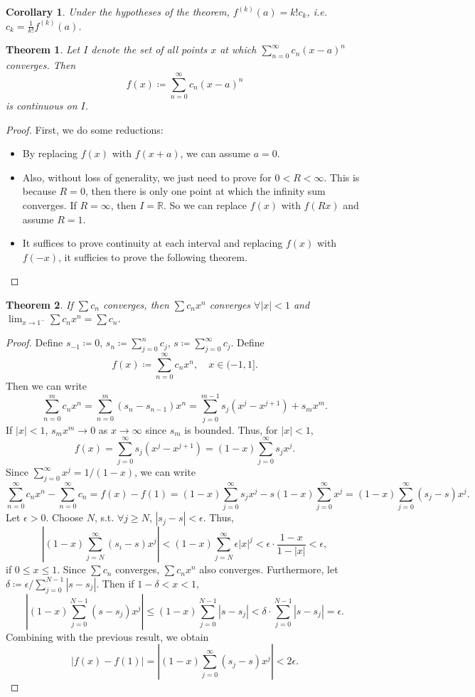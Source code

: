 \documentclass[12pt]{article}
\theoremstyle{plain}
\newtheorem{thm}{Theorem}
\newtheorem*{corollary}{Corollary}
\theoremstyle{definition}
\begin{document}
\begin{corollary}
    Under the hypotheses of the theorem, $f^{(k)}(a)=k!c_k$, i.e. $c_k=\frac{1}{k!}f^{(k)}(a)$.
\end{corollary}


\begin{thm}
    Let $I$ denote the set of all points $x$ at which $\sum_{n=0}^\infty c_n(x-a)^n$ converges.
    Then
    $$f(x)\coloneqq \sum_{n=0}^\infty c_n(x-a)^n$$
    is continuous on $I$.
\end{thm}
\begin{proof}
    First, we do some reductions:
    \begin{itemize}
        \item By replacing $f(x)$ with $f(x+a)$, we can assume $a=0$.
        \item Also, without loss of generality, we just need to prove for $0<R<\infty$.
        This is because $R=0$, then there is only one point at which the infinity sum converges.
        If $R=\infty$, then $I=\mathbb{R}$.
        So we can  replace $f(x)$ with $f(Rx)$ and assume $R=1$.
        \item It suffices to prove continuity at each interval and replacing $f(x)$ with $f(-x)$, it
        sufficies to prove the following theorem.
    \end{itemize}
\end{proof}

\begin{thm}
    If $\sum c_n$ converges, then $\sum c_n x^n$ converges $\forall |x|<1$ and $\lim_{x\rightarrow
    1^-}\sum c_n x^n = \sum c_n$.
\end{thm}
\begin{proof}
    Define $s_{-1}\coloneqq 0$, $s_n\coloneqq \sum_{j=0}^n c_j$, $s\coloneqq\sum_{j=0}^\infty c_j$.
    Define 
    $$f(x)\coloneqq \sum_{n=0}^{\infty} c_{n}x^n ,\quad x\in (-1,1].$$
    Then we can write
    $$\sum_{n=0}^m c_n x^n = \sum_{n=0}^m (s_n-s_{n-1})x^n
    =\sum_{j=0}^{m-1}s_j(x^j-x^{j+1})+s_mx^m.$$
    If $|x|<1$, $s_mx^m\rightarrow0$ as $x\rightarrow\infty$ since $s_m$ is bounded.
    Thus, for $|x|<1$,
    $$f(x)=\sum_{j=0}^\infty s_j(x^j - x^{j+1}) = (1-x)\sum_{j=0}^\infty s_j x^j.$$
    Since $\sum_{j=0}^\infty x^j = 1/(1-x)$, we can write
    $$\sum_{n=0}^\infty c_nx^n - \sum_{n=0}^\infty c_n = f(x)-f(1)=(1-x)\sum_{j=0}^\infty s_j x^j-
    s(1-x)\sum_{j=0}^\infty x^j=(1-x)\sum_{j=0}^\infty (s_j-s) x^j.$$
    Let $\epsilon>0$.
    Choose $N$, s.t. $\forall j\geq N$, $|s_j-s|<\epsilon$.
    Thus,
    $$\left|(1-x)\sum_{j=N}^\infty (s_i-s)x^j\right|
    <(1-x)\sum_{j=N}^\infty \epsilon |x|^j
    <\epsilon\cdot \frac{1-x}{1-|x|}<\epsilon,$$
    if $0\leq x\leq 1$.
    Since $\sum c_n$ converges, $\sum c_nx^n$ also converges.
    Furthermore, let $\delta\coloneqq\epsilon/\sum_{j=0}^{N-1}|s-s_j|$.
    Then if $1-\delta<x<1$,
    $$\left|(1-x)\sum_{j=0}^{N-1}(s-s_j)x^j\right|
    \leq (1-x)\sum_{j=0}^{N-1}|s-s_j|<\delta\cdot \sum_{j=0}^{N-1}|s-s_j|= \epsilon.$$
    Combining with the previous result, we obtain
    \[
        |f(x) - f(1)| = \left|(1-x)\sum_{j=0}^\infty (s_j-s)x^j\right| <
        2\epsilon.
    \]
\end{proof}
\end{document}
